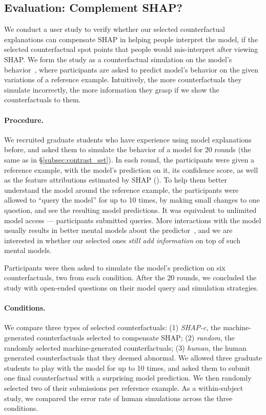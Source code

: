 \subsection{Evaluation: Complement SHAP?}
We conduct a user study to verify whether our selected counterfactual explanations can compensate SHAP in helping people interpret the model, \ie if the selected counterfactual spot points that people would mis-interpret after viewing SHAP.
We form the study as a counterfactual simulation on the model's behavior~\cite{hase2020evaluating}, where participants are asked to predict model's behavior on the given variations of a reference example.
Intuitively, the more counterfactuals they simulate incorrectly, the more information they grasp if we show the counterfactuals to them.

\paragraph{Procedure.}
We recruited  graduate students who have experience using model explanations before, and asked them to simulate the behavior of a \qqp model for 20 rounds (the same as in \S\ref{subsec:contrast_set}).
In each round, the participants were given a reference example, with the model's prediction on it, its confidence score, as well as the feature attributions estimated by SHAP ().
To help them better understand the model around the reference example, the participants were allowed to ``query the model'' for up to 10 times, by making small changes to one question, and see the resulting model predictions.
It was equivalent to unlimited model access --- participants submitted  queries.
More interactions with the model usually results in better mental models about the predictor~\cite{miller}, and we are interested in whether our selected ones \emph{still add information} on top of such mental models.

Participants were then asked to simulate the model's prediction on six counterfactuals, two from each condition.
After the 20 rounds, we concluded the study with open-ended questions on their model query and simulation strategies.

\paragraph{Conditions.} 
We compare three types of selected counterfactuals:
(1) \emph{SHAP-c}, the machine-generated counterfactuals selected to compensate SHAP; 
(2) \emph{random}, the randomly selected machine-generated counterfactuals; 
(3) \emph{human}, 
the human generated counterfactuals that they deemed abnormal.
We allowed three graduate students to play with the model for up to 10 times, and asked them to submit one final counterfactual with a surprising model prediction.
We then randomly selected two of their submissions per reference example.
As a within-subject study, we compared the error rate of human simulations across the three conditions.


